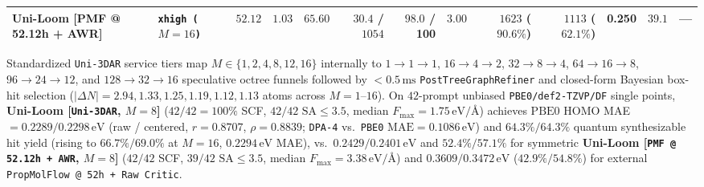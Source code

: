 \documentclass[11pt,a4paper]{article}
\begin{document}
\begin{table}[t]
{\begin{tabular}{@{}llrrrrrrrrrrr@{}}
\textbf{Uni-Loom [PMF @ 52.12h + AWR]} & \texttt{xhigh ($M=16$)} & $52.12$ & $1.03$ & $65.60$ & $30.4$ / $1054$ & $98.0$ / \textbf{100} & $3.00$ & $1623$ ($90.6\%$) & $1113$ ($62.1\%$) & \textbf{0.250} & $39.1$ & --- \\
\bottomrule
\end{tabular}%
}
\vspace{3pt}\par{\footnotesize
Standardized \texttt{Uni-3DAR} service tiers map $M\in\{1,2,4,8,12,16\}$ internally to $1\to 1\to 1$, $16\to 4\to 2$, $32\to 8\to 4$, $64\to 16\to 8$, $96\to 24\to 12$, and $128\to 32\to 16$ speculative octree funnels followed by $<0.5\,\text{ms}$ \texttt{PostTreeGraphRefiner} and closed-form Bayesian box-hit selection ($|\Delta N| = 2.94, 1.33, 1.25, 1.19, 1.12, 1.13$ atoms across $M=1\text{--}16$). On $42$-prompt unbiased \texttt{PBE0/def2-TZVP/DF} single points, \textbf{Uni-Loom [\texttt{Uni-3DAR}, $M=8$]} ($42/42 = 100\%$ SCF, $42/42$ $\text{SA}\le 3.5$, median $F_{\max}=1.75\,\text{eV/\AA}$) achieves $\text{PBE0}$ HOMO MAE $= \mathbf{0.2289} / \mathbf{0.2298}\,\text{eV}$ (raw / centered, $r=0.8707$, $\rho=0.8839$; \texttt{DPA-4} vs.\ \texttt{PBE0} $\text{MAE}=0.1086\,\text{eV}$) and $64.3\% / 64.3\%$ quantum synthesizable hit yield (rising to $\mathbf{66.7\%} / \mathbf{69.0\%}$ at $M=16$, $0.2294\,\text{eV}$ MAE), vs.\ $0.2429 / 0.2401\,\text{eV}$ and $52.4\% / 57.1\%$ for symmetric \textbf{Uni-Loom [\texttt{PMF @ 52.12h + AWR}, $M=8$]} ($42/42$ SCF, $39/42$ $\text{SA}\le 3.5$, median $F_{\max}=3.38\,\text{eV/\AA}$) and $0.3609 / 0.3472\,\text{eV}$ ($42.9\% / 54.8\%$) for external \texttt{PropMolFlow @ 52h + Raw Critic}.}
\end{table}
\end{document}
